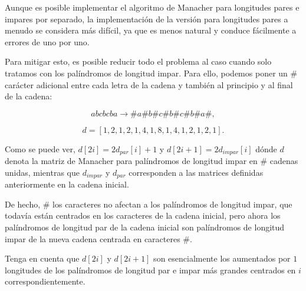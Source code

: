Aunque es posible implementar el algoritmo de Manacher para longitudes pares e impares por separado, la implementación de la versión para longitudes pares a menudo se considera más difícil, ya que es menos natural y conduce fácilmente a errores de uno por uno.

Para mitigar esto, es posible reducir todo el problema al caso cuando solo tratamos con los palíndromos de longitud impar. Para ello, podemos poner un \# carácter adicional entre cada letra de la cadena y también al principio y al final de la cadena:

$$abcbcba \to \#a\#b\#c\#b\#c\#b\#a\#,$$

$$d = [1,2,1,2,1,4,1,8,1,4,1,2,1,2,1].$$


Como se puede ver, $d[2i]=2 d_{par}[i]+1$ y $d[2i+1]=2 d_{impar}[i]$ dónde $d$ denota la matriz de Manacher para palíndromos de longitud impar en \# cadenas unidas, mientras que $d_{impar}$ y $d_{par}$ corresponden a las matrices definidas anteriormente en la cadena inicial.

De hecho, \# los caracteres no afectan a los palíndromos de longitud impar, que todavía están centrados en los caracteres de la cadena inicial, pero ahora los palíndromos de longitud par de la cadena inicial son palíndromos de longitud impar de la nueva cadena centrada en caracteres \#.

Tenga en cuenta que $d[2i]$ y $d[2i+1]$ son esencialmente los aumentados por $1$ longitudes de los palíndromos de longitud par e impar más grandes centrados en $i$ correspondientemente.
